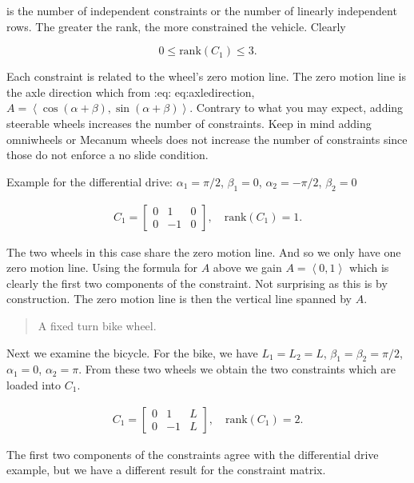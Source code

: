 is the number of independent constraints or the number of linearly
independent rows. The greater the rank, the more constrained the
vehicle. Clearly

\[0 \leq \mbox{rank}(C_1) \leq 3.\]

Each constraint is related to the wheel's zero motion line. The zero
motion line is the axle direction which from :eq: {eq:axledirection},
\(A = \left\langle \cos(\alpha+\beta) , \sin(\alpha+\beta) \right\rangle\).
Contrary to what you may expect, adding steerable wheels increases the
number of constraints. Keep in mind adding omniwheels or Mecanum wheels
does not increase the number of constraints since those do not enforce a
no slide condition.

Example for the differential drive: \(\alpha_1=\pi/2\), \(\beta_1 = 0\),
\(\alpha_2=-\pi/2\), \(\beta_2 = 0\)

\[\begin{aligned}
C_1 = \begin{bmatrix} 0 & 1 & 0\\ 0 & -1 & 0 \end{bmatrix}, \quad \mbox{rank}(C_1) = 1.
\end{aligned}\]

The two wheels in this case share the zero motion line. And so we only
have one zero motion line. Using the formula for \(A\) above we gain
\(A = \left\langle 0 , 1 \right\rangle\) which is clearly the first two
components of the constraint. Not surprising as this is by construction.
The zero motion line is then the vertical line spanned by \(A\).

\begin{quote}
A fixed turn bike wheel.
\end{quote}

Next we examine the bicycle. For the bike, we have \(L_1 = L_2=L\),
\(\beta_1=\beta_2 = \pi/2\), \(\alpha_1=0\), \(\alpha_2=\pi\). From
these two wheels we obtain the two constraints which are loaded into
\(C_1\).

\[\begin{aligned}
C_1 = \begin{bmatrix} 0 & 1 & L\\ 0 & -1 & L \end{bmatrix}, \quad \mbox{rank}(C_1) = 2.
\end{aligned}\]

The first two components of the constraints agree with the differential
drive example, but we have a different result for the constraint matrix.

